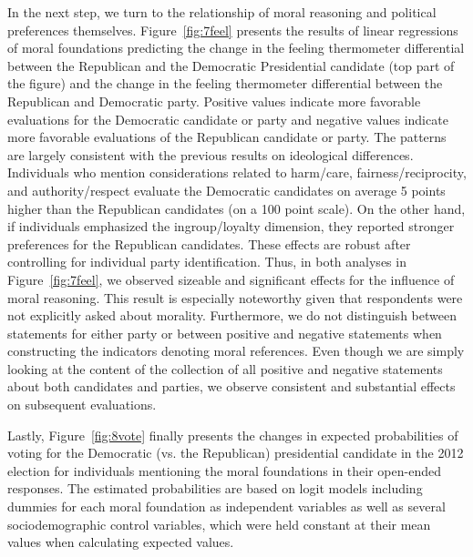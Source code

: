 \documentclass[12pt]{article}
\begin{document}
In the next step, we turn to the relationship of moral reasoning and political preferences themselves. Figure~\ref{fig:7feel} presents the results of linear regressions of moral foundations predicting the change in the feeling thermometer differential between the Republican and the Democratic Presidential candidate (top part of the figure) and the change in the feeling thermometer differential between the Republican and Democratic party. Positive values indicate more favorable evaluations for the Democratic candidate or party and negative values indicate more favorable evaluations of the Republican candidate or party. The patterns are largely consistent with the previous results on ideological differences. Individuals who mention considerations related to harm/care, fairness/reciprocity, and authority/respect evaluate the Democratic candidates on average 5 points higher than the Republican candidates (on a 100 point scale). On the other hand, if individuals emphasized the ingroup/loyalty dimension, they reported stronger preferences for the Republican candidates. These effects are robust after controlling for individual party identification. Thus, in both analyses in Figure~\ref{fig:7feel}, we observed sizeable and significant effects for the influence of moral reasoning. This result is especially noteworthy given that respondents were not explicitly asked about morality. Furthermore, we do not distinguish between statements for either party or between positive and negative statements when constructing the indicators denoting moral references. Even though we are simply looking at the content of the collection of all positive and negative statements about both candidates and parties, we observe consistent and substantial effects on subsequent evaluations.

Lastly, Figure~\ref{fig:8vote} finally presents the changes in expected probabilities of voting for the Democratic (vs. the Republican) presidential candidate in the 2012 election for individuals mentioning the moral foundations in their open-ended responses. The estimated probabilities are based on logit models including dummies for each moral foundation as independent variables as well as several sociodemographic control variables, which were held constant at their mean values when calculating expected values.
\end{document}

